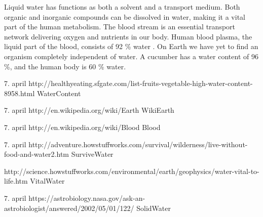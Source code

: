 Liquid water has functions as both a solvent and a transport medium. Both organic and inorganic compounds can be dissolved in water, making it a vital part of the human metabolism. The blood stream is an essential transport network delivering oxygen and nutrients in our body. Human blood plasma, the liquid part of the blood, consists of 92 \% water \cite{Blood}. On Earth we have yet to find an organism completely independent of water. A cucumber has a water content of 96 \%, and the human body is 60 \% water. 


7. april http://healthyeating.sfgate.com/list-fruits-vegetable-high-water-content-8958.html WaterContent

7. april http://en.wikipedia.org/wiki/Earth WikiEarth

7. april http://en.wikipedia.org/wiki/Blood Blood

7. april http://adventure.howstuffworks.com/survival/wilderness/live-without-food-and-water2.htm SurviveWater

http://science.howstuffworks.com/environmental/earth/geophysics/water-vital-to-life.htm VitalWater

7. april https://astrobiology.nasa.gov/ask-an-astrobiologist/answered/2002/05/01/122/ SolidWater